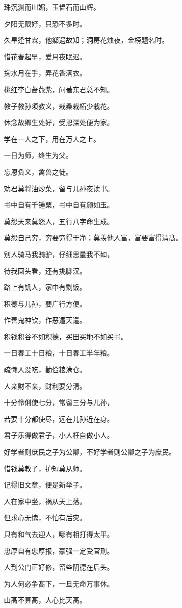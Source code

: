 \documentclass[12pt,oneside]{book}
\begin{document}
珠沉渊而川媚，玉韫石而山辉。

夕阳无限好，只恐不多时。

久旱逢甘霖，他鄕遇故知；洞房花烛夜，金榜题名时。

惜花春起早，爱月夜眠迟。

掬水月在手，弄花香满衣。

桃红李白蔷薇紫，问著东君总不知。

教子教孙须教义，栽桑栽柘少栽花。

休念故鄕生处好，受恩深处便为家。

学在一人之下，用在万人之上。

一日为师，终生为父。

忘恩负义，禽兽之徒。

劝君莫将油炒菜，留与儿孙夜读书。

书中自有千锺粟，书中自有颜如玉。

莫怨天来莫怨人，五行八字命生成。

莫怨自己穷，穷要穷得干净；莫羡他人富，富要富得淸髙。

别人骑马我骑驴，仔细思量我不如，

待我回头看，还有挑脚汉。

路上有饥人，家中有剩饭。

积德与儿孙，要广行方便。

作善鬼神钦，作恶遭天遣。

积钱积谷不如积德，买田买地不如买书。

一日春工十日粮，十日春工半年粮。

疏懒人没吃，勤俭粮满仓。

人亲财不亲，财利要分淸。

十分伶俐使七分，常留三分与儿孙，

若要十分都使尽，远在儿孙近在身。

君子乐得做君子，小人枉自做小人。

好学者则庶民之子为公卿，不好学者则公卿之子为庶民。

惜钱莫教子，护短莫从师。

记得旧文章，便是新举子。

人在家中坐，祸从天上落。

但求心无愧，不怕有后灾。

只有和气去迎人，哪有相打得太平。

忠厚自有忠厚报，豪强一定受官刑。

人到公门正好修，留些阴德在后头。

为人何必争髙下，一旦无命万事休。

山髙不算髙，人心比天髙。
\end{document}
